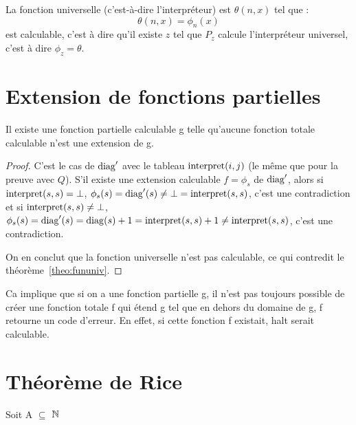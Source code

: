 \begin{mytheo}
  \label{theo:fununiv}
	La fonction universelle (c'est-à-dire l'interpréteur) est $\theta(n,x)$ tel que :
	\[ \theta(n,x) = \phi_n(x) \]
    est calculable, c'est à dire qu'il existe $z$ tel que $P_z$ calcule l'interpréteur universel,
    c'est à dire $\phi_z = \theta$.
\end{mytheo}


\section{Extension de fonctions partielles}
\label{sub:extension_de_fonctions_partielles}

\begin{mytheo}
	Il existe une fonction partielle calculable g telle qu'aucune fonction totale calculable n'est une extension de g.
  \begin{proof}
    C'est le cas de $\operatorname{diag}'$ avec le tableau $\operatorname{interpret}(i,j)$ (le même que pour la preuve avec $Q$). S'il existe une extension calculable $f = \phi_s$ de $\operatorname{diag}'$,
    alors si $\operatorname{interpret}(s,s) = \bot$, $\phi_s(s) = \operatorname{diag}'(s) \neq \bot = \operatorname{interpret}(s,s)$, c'est une contradiction
    et si $\operatorname{interpret}(s,s) \neq \bot$, $\phi_s(s) = \operatorname{diag}'(s) = \operatorname{diag}(s)+1 = \operatorname{interpret}(s,s)+1 \neq \operatorname{interpret}(s,s)$,
    c'est une contradiction.

    On en conclut que la fonction universelle n'est pas calculable, ce qui contredit le théorème~\ref{theo:fununiv}.
  \end{proof}
\end{mytheo}

\begin{myrem}
	Ca implique que si on a une fonction partielle g, il n'est pas
	toujours possible de créer une fonction totale f qui étend g
	tel que en dehors du domaine de g, f retourne un code d'erreur.  En effet, si cette fonction f existait, halt serait calculable.
\end{myrem}


\section{Théorème de Rice}
\label{sub:th_or_me_de_rice}

Soit A $\subseteq$ $\mathbb{N}$

